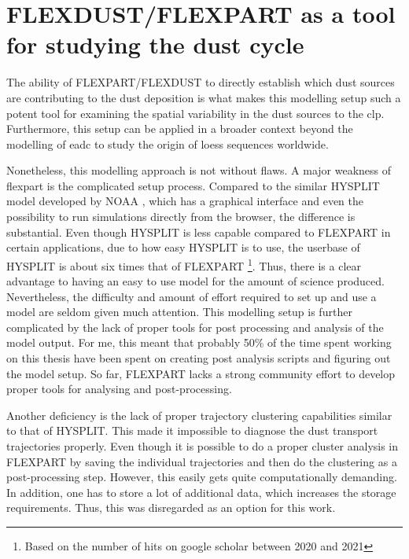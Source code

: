 
\section{FLEXDUST/FLEXPART as a tool for studying the dust cycle}
The ability of FLEXPART/FLEXDUST to directly establish which dust sources  are contributing to the dust deposition is what makes this modelling setup such a potent tool for examining the spatial variability in the dust sources to the \acrshort{clp}. Furthermore, this setup can be applied in a broader context beyond the modelling of \acrshort{eadc} to study the origin of loess sequences worldwide. 

Nonetheless, this modelling approach is not without flaws.
A major weakness of \acrshort{flexpart} is the complicated setup process.
Compared to the similar HYSPLIT model developed by NOAA \parencite{draxler2010hysplit}, which has a graphical interface and even the possibility to run simulations directly from the browser, the difference is substantial. Even though HYSPLIT is less capable compared to FLEXPART in certain applications, due to how easy HYSPLIT is to use, the userbase of HYSPLIT is about six times that of FLEXPART \footnote{Based on the number of hits on google scholar between 2020 and 2021}. Thus, there is a clear advantage to having an easy to use model for the amount of science produced.   
Nevertheless, the difficulty and amount of effort required to set up and use a model are seldom given much attention. 
This modelling setup is further complicated by the lack of proper tools for post processing and analysis of the model output. 
For me, this meant that probably 50\% of the time spent working on this thesis have been spent on creating post analysis scripts and figuring out the model setup.
So far, FLEXPART lacks a strong community effort to develop proper tools for analysing and post-processing. 

Another deficiency is the lack of proper trajectory clustering capabilities similar to that of HYSPLIT. This made it impossible to diagnose the dust transport trajectories properly. 
Even though it is possible to do a proper cluster analysis in FLEXPART by saving the  individual trajectories and then do the clustering as a post-processing step. However, this easily gets quite computationally demanding. In addition, one has to store a lot of additional data, which increases the storage requirements. Thus, this was disregarded as an option for this work. 

